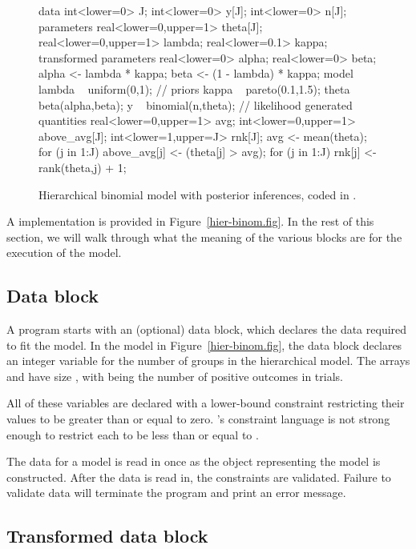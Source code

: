\documentclass[article]{jss}
\begin{document}
\begin{figure}
\begin{Code}
data {
  int<lower=0> J;
  int<lower=0> y[J];
  int<lower=0> n[J];
}
parameters {
  real<lower=0,upper=1> theta[J];
  real<lower=0,upper=1> lambda;
  real<lower=0.1> kappa;
}
transformed parameters {
  real<lower=0> alpha;
  real<lower=0> beta;
  alpha <- lambda * kappa;
  beta <- (1 - lambda) * kappa;
}
model {
  lambda ~ uniform(0,1);     // priors
  kappa ~ pareto(0.1,1.5);
  theta ~ beta(alpha,beta);
  y ~ binomial(n,theta);     // likelihood
}
generated quantities {
  real<lower=0,upper=1> avg;
  int<lower=0,upper=1> above_avg[J];
  int<lower=1,upper=J> rnk[J];
  avg <- mean(theta);
  for (j in 1:J)
    above_avg[j] <- (theta[j] > avg);
  for (j in 1:J)
    rnk[j] <- rank(theta,j) + 1;
}
\end{Code}
  \caption{Hierarchical binomial model with posterior inferences,
    coded in .}
\end{figure}
%
A  implementation is provided in
Figure~\ref{hier-binom.fig}.  In the rest of this section, we will
walk through what the meaning of the various blocks are for the
execution of the model.

\subsection{Data block}

A  program starts with an (optional) data block, which
declares the data required to fit the model.  In the model in
Figure~\ref{hier-binom.fig}, the data block declares an integer
variable  for the number of groups in the hierarchical model.
The arrays  and  have size , with 
being the number of positive outcomes in  trials.  

All of these variables are declared with a lower-bound constraint
restricting their values to be greater than or equal to zero.
's constraint language is not strong enough to restrict
each  to be less than or equal to .

The data for a  model is read in once as the
 object representing the model is constructed.  After
the data is read in, the constraints are validated.  Failure to
validate data will terminate the program and print an error message.

\subsection{Transformed data block}
\end{document}
